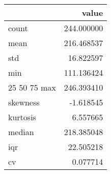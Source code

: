 \begin{tabular}{lr}
\toprule
 & value \\
\midrule
count & 244.000000 \\
mean & 216.468537 \\
std & 16.822597 \\
min & 111.136424 \\
25%
50%
75%
max & 246.393410 \\
skewness & -1.618545 \\
kurtosis & 6.557665 \\
median & 218.385048 \\
iqr & 22.505218 \\
cv & 0.077714 \\
\bottomrule
\end{tabular}
